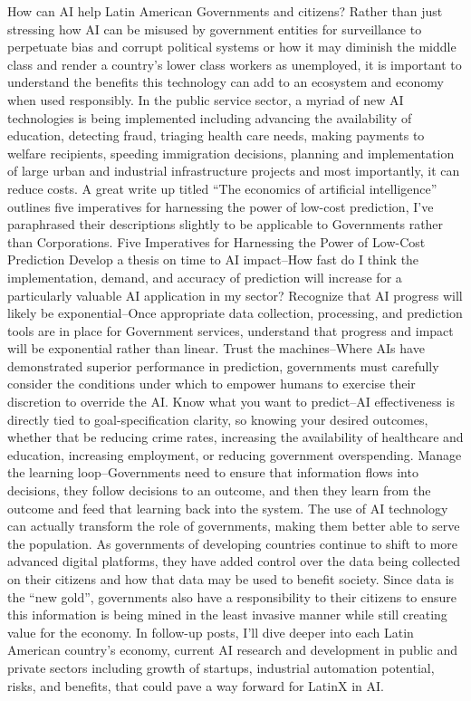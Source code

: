 \documentclass[conference]{IEEEtran}
\begin{document}
How can AI help Latin American Governments and citizens?
Rather than just stressing how AI can be misused by government entities for surveillance to perpetuate bias and corrupt political systems or how it may diminish the middle class and render a country's lower class workers as unemployed, it is important to understand the benefits this technology can add to an ecosystem and economy when used responsibly.
In the public service sector, a myriad of new AI technologies is being implemented including advancing the availability of education, detecting fraud, triaging health care needs, making payments to welfare recipients, speeding immigration decisions, planning and implementation of large urban and industrial infrastructure projects and most importantly, it can reduce costs.
A great write up titled ``The economics of artificial intelligence'' outlines five imperatives for harnessing the power of low-cost prediction, I've paraphrased their descriptions slightly to be applicable to Governments rather than Corporations.
Five Imperatives for Harnessing the Power of Low-Cost Prediction
Develop a thesis on time to AI impact--How fast do I think the implementation, demand, and accuracy of prediction will increase for a particularly valuable AI application in my sector?
Recognize that AI progress will likely be exponential--Once appropriate data collection, processing, and prediction tools are in place for Government services, understand that progress and impact will be exponential rather than linear.
Trust the machines--Where AIs have demonstrated superior performance in prediction, governments must carefully consider the conditions under which to empower humans to exercise their discretion to override the AI.
Know what you want to predict--AI effectiveness is directly tied to goal-specification clarity, so knowing your desired outcomes, whether that be reducing crime rates, increasing the availability of healthcare and education, increasing employment, or reducing government overspending.
Manage the learning loop--Governments need to ensure that information flows into decisions, they follow decisions to an outcome, and then they learn from the outcome and feed that learning back into the system.
The use of AI technology can actually transform the role of governments, making them better able to serve the population. As governments of developing countries continue to shift to more advanced digital platforms, they have added control over the data being collected on their citizens and how that data may be used to benefit society. Since data is the ``new gold'', governments also have a responsibility to their citizens to ensure this information is being mined in the least invasive manner while still creating value for the economy.
In follow-up posts, I'll dive deeper into each Latin American country's economy, current AI research and development in public and private sectors including growth of startups, industrial automation potential, risks, and benefits, that could pave a way forward for LatinX in AI.
\end{document}
